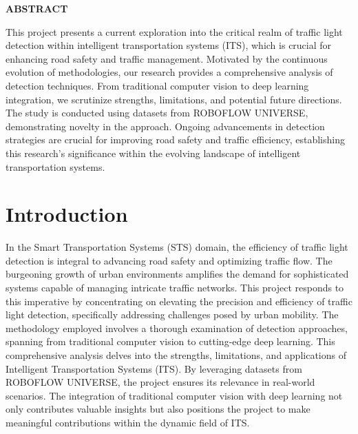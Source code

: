 \documentclass[12 pt]{report}
\begin{document}
\newpage
\begin{center}
  \begin{Large}
    \textbf{ABSTRACT}
  \end{Large}
\end{center}
\justify
This project presents a current exploration into the critical realm of traffic light detection within intelligent transportation systems (ITS), which is crucial for enhancing road safety and traffic management. Motivated by the continuous evolution of methodologies, our research provides a comprehensive analysis of detection techniques. From traditional computer vision to deep learning integration, we scrutinize strengths, limitations, and potential future directions. The study is conducted using datasets from ROBOFLOW UNIVERSE, demonstrating novelty in the approach. Ongoing advancements in detection strategies are crucial for improving road safety and traffic efficiency, establishing this research's significance within the evolving landscape of intelligent transportation systems.
\flushright

\newpage
\tableofcontents

\flushleft
\newpage
\chapter{Introduction}
\justify
In the Smart Transportation Systems (STS) domain, the efficiency of traffic light detection is integral to advancing road safety and optimizing traffic flow. The burgeoning growth of urban environments amplifies the demand for sophisticated systems capable of managing intricate traffic networks. This project responds to this imperative by concentrating on elevating the precision and efficiency of traffic light detection, specifically addressing challenges posed by urban mobility. The methodology employed involves a thorough examination of detection approaches, spanning from traditional computer vision to cutting-edge deep learning. This comprehensive analysis delves into the strengths, limitations, and applications of Intelligent Transportation Systems (ITS). By leveraging datasets from ROBOFLOW UNIVERSE, the project ensures its relevance in real-world scenarios. The integration of traditional computer vision with deep learning not only contributes valuable insights but also positions the project to make meaningful contributions within the dynamic field of ITS.
\flushleft
\end{document}
